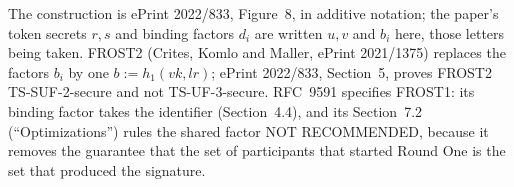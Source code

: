 \documentclass[11pt,a4paper]{article}
\theoremstyle{definition}
\begin{document}
The construction is ePrint 2022/833, Figure~8, in additive notation; the
paper's token secrets \(r, s\) and binding factors \(d_i\) are written
\(u, v\) and \(b_i\) here, those letters being taken. FROST2 (Crites, Komlo
and Maller, ePrint 2021/1375) replaces the factors \(b_i\) by one
\(b := h_1(\mathit{vk}, \mathit{lr})\); ePrint 2022/833, Section~5, proves
FROST2 TS-SUF-2-secure and not TS-UF-3-secure. RFC~9591 specifies FROST1:
its binding factor takes the identifier (Section~4.4), and its Section~7.2
(``Optimizations'') rules the shared factor NOT RECOMMENDED, because it
removes the guarantee that the set of participants that started Round One is
the set that produced the signature.

\end{document}
